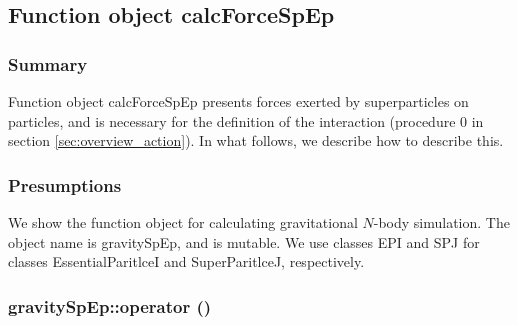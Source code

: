 \subsection{Function object calcForceSpEp}
\label{sec:example_userdefined_calcForceSpEp}

\subsubsection{Summary}

Function object calcForceSpEp presents forces exerted by
superparticles on particles, and is necessary for the definition of
the interaction (procedure 0 in section \ref{sec:overview_action}). In
what follows, we describe how to describe this.

\subsubsection{Presumptions}

We show the function object for calculating gravitational $N$-body
simulation. The object name is gravitySpEp, and is mutable. We use
classes EPI and SPJ for classes EssentialParitlceI and SuperParitlceJ,
respectively.

\subsubsection{gravitySpEp::operator ()}

